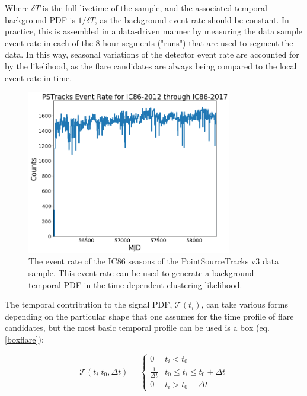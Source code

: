 Where $\delta T$ is the full livetime of the sample, and the associated temporal background PDF is $1/\delta T$, as the background event rate should be constant. In practice, this is assembled in a data-driven manner by measuring the data sample event rate in each of the 8-hour segments ("runs") that are used to segment the data. In this way, seasonal variations of the detector event rate are accounted for by the likelihood, as the flare candidates are always being compared to the local event rate in time.

\begin{figure}[h]
\centering
\includegraphics[width=0.8\textwidth]{figs/evt_rate.png}
\caption{The event rate of the IC86 seasons of the PointSourceTracks v3 data sample. This event rate can be used to generate a background temporal PDF in the time-dependent clustering likelihood.}
\label{fig:evt_rate}
\end{figure}

The temporal contribution to the signal PDF, $\mathcal{T}(t_i)$, can take various forms depending on the particular shape that one assumes for the time profile of flare candidates, but the most basic temporal profile can be used is a box (eq. \ref{boxflare}):

\begin{equation}
    \mathcal{T}(t_i | t_0, \Delta t) = 
    \begin{cases} 
      0 & t_i < t_0 \\
      \frac{1}{\Delta t} & t_0 \leq t_i \leq t_0+\Delta t \\
      0 & t_i > t_0 + \Delta t
   \end{cases}
   \label{boxflare}
\end{equation}

